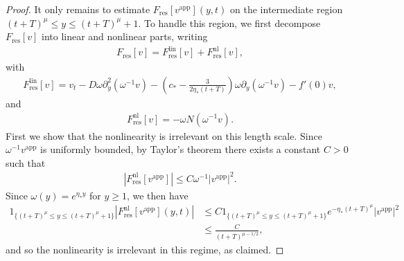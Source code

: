 \documentclass[11pt]{article}
\numberwithin{equation}{section}
\numberwithin{prop}{section}
\begin{document}
\begin{proof}
	It only remains to estimate $F_\mathrm{res} [v^\mathrm{app}] (y,t)$ on the intermediate region $(t+T)^\mu \leq y \leq (t+T)^\mu + 1$. To handle this region, we first decompose $F_\mathrm{res}[v]$ into linear and nonlinear parts, writing
	\begin{align}
	F_\mathrm{res}[v] = F_\mathrm{res}^\mathrm{lin}[v] + F_\mathrm{res}^\mathrm{nl} [v],
	\end{align}
	with
	\begin{align}
	F_\mathrm{res}^\mathrm{lin} [v] = v_t - D \omega \partial_y^2 (\omega^{-1} v) - \left( c_* - \frac{3}{2 \eta_* (t+T)} \right) \omega \partial_y (\omega^{-1} v) - f'(0) v, 
	\end{align}
	and
	\begin{align}
	F_\mathrm{res}^\mathrm{nl} [v] = - \omega N(\omega^{-1} v). 
	\end{align}
	First we show that the nonlinearity is irrelevant on this length scale. Since $\omega^{-1} v^\mathrm{app}$ is uniformly bounded, by Taylor's theorem there exists a constant $C > 0$ such that
	\begin{align*}
	|F_\mathrm{res}^\mathrm{nl} [v^\mathrm{app}]| \leq C \omega^{-1} |v^\mathrm{app}|^2. 
	\end{align*}
	Since $\omega(y) = e^{\eta_* y}$ for $y \geq 1$, we then have
	\begin{align*}
		1_{\{ (t+T)^\mu \leq y \leq (t+T)^\mu + 1 \}} |F_\mathrm{res}^\mathrm{nl} [v^\mathrm{app}] (y,t)| &\leq C 1_{\{ (t+T)^\mu \leq y \leq (t+T)^\mu + 1 \}} e^{-\eta_* (t+T)^\mu} |v^\mathrm{app}|^2 \\
		&\leq \frac{C}{(t+T)^{\mu - 1/2}},
	\end{align*}
	and so the nonlinearity is irrelevant in this regime, as claimed. 
	

\end{proof}
\end{document}
